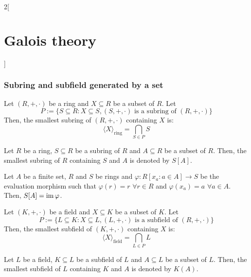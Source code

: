 \documentclass[../../../main.tex]{subfiles}
\begin{document}
\begin{multicols}{2}[\section{Galois theory}]
  \subsubsection{Subring and subfield generated by a set}
  \begin{definition}
    Let $(R,+,\cdot)$ be a ring and $X\subseteq R$ be a subset of $R$. Let $$P:=\{S\subseteq R: X\subseteq S,(S,+,\cdot)\text{ is a subring of }(R,+,\cdot)\}$$ Then, the smallest subring of $(R,+,\cdot)$ containing $X$ is: $$\langle X\rangle_\text{ring}=\bigcap_{S\in P}S$$
  \end{definition}
  \begin{definition}
    Let $R$ be a ring, $S\subseteq R$ be a subring of $R$ and $A\subseteq R$ be a subset of $R$. Then, the smallest subring of $R$ containing $S$ and $A$ is denoted by $S[A]$.
  \end{definition}
  \begin{lemma}
    Let $A$ be a finite set, $R$ and $S$ be rings and $\varphi:R[x_a:a\in A]\rightarrow S$ be the evaluation morphism such that $\varphi(r)=r$ $\forall r\in R$ and $\varphi(x_a)=a$ $\forall a\in A$. Then, $S[A]=\operatorname{im}\varphi$.
  \end{lemma}
  \begin{definition}
    Let $(K,+,\cdot)$ be a field and $X\subseteq K$ be a subset of $K$. Let $$P:=\{L\subseteq K: X\subseteq L,(L,+,\cdot)\text{ is a subfield of }(R,+,\cdot)\}$$ Then, the smallest subfield of $(K,+,\cdot)$ containing $X$ is: $$\langle X\rangle_\text{field}=\bigcap_{L\in P}L$$
  \end{definition}
  \begin{definition}
    Let $L$ be a field, $K\subseteq L$ be a subfield of $L$ and $A\subseteq L$ be a subset of $L$. Then, the smallest subfield of $L$ containing $K$ and $A$ is denoted by $K(A)$.
  \end{definition}

\end{multicols}
\end{document}
